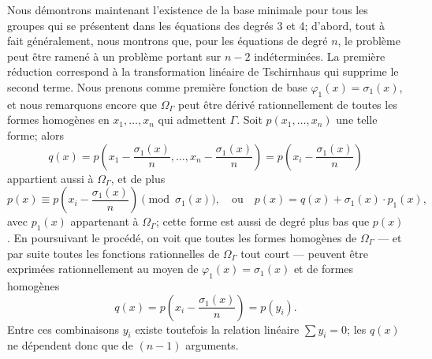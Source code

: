 Nous démontrons maintenant l'existence de la base minimale pour tous les groupes qui se présentent dans les équations des degrés 3 et 4; d'abord, tout à fait généralement, nous montrons que, pour les équations de degré $n$, le problème peut être ramené à un problème portant sur $n-2$ indéterminées. La première réduction correspond à la transformation linéaire de Tschirnhaus qui supprime le second terme. Nous prenons comme première fonction de base $\varphi_1(x)=\sigma_1(x)$, et nous remarquons encore que $\Omega_\Gamma$ peut être dérivé rationnellement de toutes les formes homogènes en $x_1,
\ldots,x_n$ qui admettent $\Gamma$. Soit $p(x_1,
\ldots,x_n)$ une telle forme; alors
\[
q(x)=p\left(x_1-\frac{\sigma_1(x)}{n},\ldots,x_n-\frac{\sigma_1(x)}{n}\right)=p\left(x_i-\frac{\sigma_1(x)}{n}\right)
\]
appartient aussi à $\Omega_\Gamma$, et de plus
\[
p(x)\equiv p\left(x_i-\frac{\sigma_1(x)}{n}\right)\pmod{\sigma_1(x)},
\quad\text{ou}\quad
p(x)=q(x)+\sigma_1(x)\cdot p_1(x),
\]
avec $p_1(x)$ appartenant à $\Omega_\Gamma$; cette forme est aussi de degré plus bas que $p(x)$. En poursuivant le procédé, on voit que toutes les formes homogènes de $\Omega_\Gamma$ --- et par suite toutes les fonctions rationnelles de $\Omega_\Gamma$ tout court --- peuvent être exprimées rationnellement au moyen de $\varphi_1(x)=\sigma_1(x)$ et de formes homogènes
\[
q(x)=p\left(x_i-\frac{\sigma_1(x)}{n}\right)=p(y_i).
\]
Entre ces combinaisons $y_i$ existe toutefois la relation linéaire $\sum y_i=0$; les $q(x)$ ne dépendent donc que de $(n-1)$ arguments.

